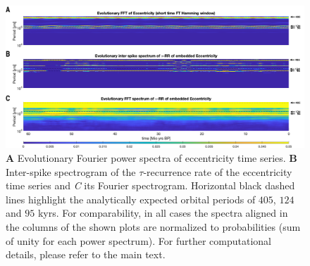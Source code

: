 \documentclass[entropy,article,submit,pdftex,moreauthors]{Definitions/mdpi}
\begin{document}
\begin{figure}
 \centering
 \includegraphics[width=\textwidth]{./figures/fig_laskar_spectra}
 \caption{\textbf{A} Evolutionary Fourier power spectra of eccentricity time series. \textbf{B} Inter-spike spectrogram of the $\tau$-recurrence rate of the eccentricity time 
 series and \textit{C} its Fourier spectrogram. Horizontal black dashed lines highlight the analytically expected orbital periods of $405$, $124$ and $95$ kyrs. 
 For comparability, in all cases the spectra aligned in the columns of the shown plots are normalized to probabilities (sum of unity for 
 each power spectrum). For further computational details, please refer to the main text.}  
\label{fig_laskar_spectra}
\end{figure}
\end{document}
